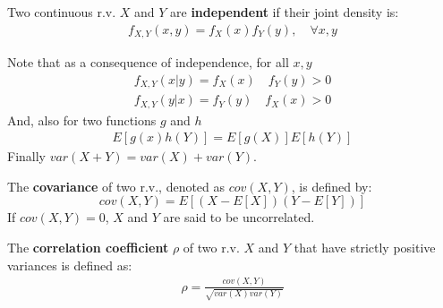 \documentclass[aspectratio=169]{beamer}
\begin{document}
\begin{frame}
    \begin{definition}
        Two continuous r.v. $X$ and $Y$ are \textbf{independent} if their joint density  is:
        \begin{align*}
            f_{X,Y}(x,y)=f_X(x)f_Y(y),\quad \forall x,y
        \end{align*}
        \end{definition}
        \vspace{0.2cm}
    Note that as a consequence of independence, for all $x,y$
    \begin{align*}
        f_{X,Y}(x|y)=f_X(x)\quad f_Y(y)>0\\
        f_{X,Y}(y|x)=f_Y(y)\quad f_X(x)>0
    \end{align*}
    And, also for two functions $g$ and $h$
    \begin{align*}
        E[g(x)h(Y)]=E[g(X)]E[h(Y)]
    \end{align*}
    Finally $var(X+Y)=var(X)+var(Y)$.
    
\end{frame}

\begin{frame}
    \begin{definition}
        The \textbf{covariance} of two r.v., denoted as $cov(X,Y)$, is defined by:
        $$cov(X,Y)=E[(X-E[X])(Y-E[Y])]$$
        If $cov(X,Y)=0$, $X$ and $Y$ are said to be uncorrelated.
    \end{definition}
    \begin{definition}
        The \textbf{correlation coefficient} $\rho$ of two r.v. $X$ and $Y$ that have strictly positive variances is defined as:
        \begin{align*}
            \rho=\frac{cov(X,Y)}{\sqrt{var(X)var(Y)}}
        \end{align*}
    \end{definition}
\end{frame}
\end{document}
